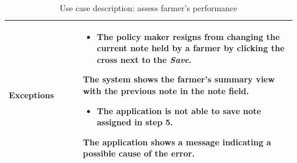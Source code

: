 \begin{table}[H]
\begin{tabular}{@{}p{0.25\linewidth} p{0.72\linewidth}@{}}
		\textbf{Exceptions}         & \begin{itemize}[leftmargin=.4cm,noitemsep,topsep=0pt,before=\vspace{-3mm}]
		   \item The policy maker resigns from changing the current note held by a farmer by clicking the cross next to the \textit{Save}. 
		\end{itemize}
	    The system shows the farmer's summary view with the previous note in the note field.
	    \begin{itemize}[leftmargin=.4cm,noitemsep,topsep=0pt]
		   \item The application is not able to save note assigned in step 5.
		\end{itemize}
		The application shows a message indicating a possible cause of the error.
		\\\bottomrule
	\end{tabular}
	\caption{Use case description: assess farmer's performance} 
\end{table}

